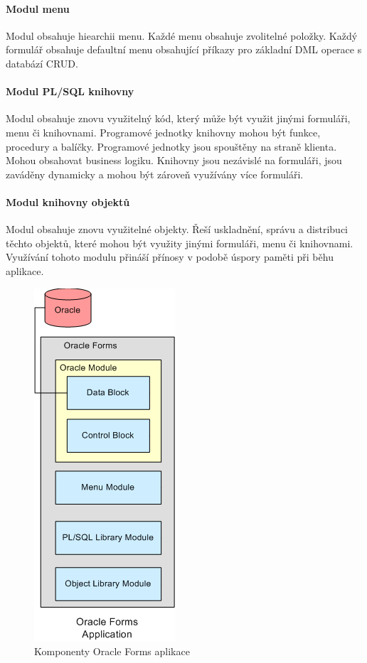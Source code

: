\documentclass{diplomka}
\begin{document}
\paragraph{Modul menu} 
Modul obsahuje hiearchii menu. Každé menu obsahuje zvolitelné položky. Každý formulář obsahuje defaultní menu obsahující příkazy pro základní DML operace s databází CRUD.

\paragraph{Modul PL/SQL knihovny}
Modul obsahuje znovu využitelný kód, který může být využit jinými formuláři, menu či knihovnami. Programové jednotky knihovny mohou být funkce, procedury a balíčky. Programové jednotky jsou spouštěny na straně klienta. Mohou obsahovat business logiku. Knihovny jsou nezávislé na formuláři, jsou zaváděny dynamicky a mohou být zároveň využívány více formuláři.

\paragraph{Modul knihovny objektů}
Modul obsahuje znovu využitelné objekty. Řeší uskladnění, správu a distribuci těchto objektů, které mohou být využity jinými formuláři, menu či knihovnami. Využívání tohoto modulu přináší přínosy v podobě úspory paměti při běhu aplikace.

\begin{figure}[H]
  \centering
  \includegraphics[scale=0.8]{obr/forms_arch3.png}
\caption{Komponenty Oracle Forms aplikace\cite{microsoft}}
\label{fig:arch3}
\end{figure}
\newpage
\end{document}
